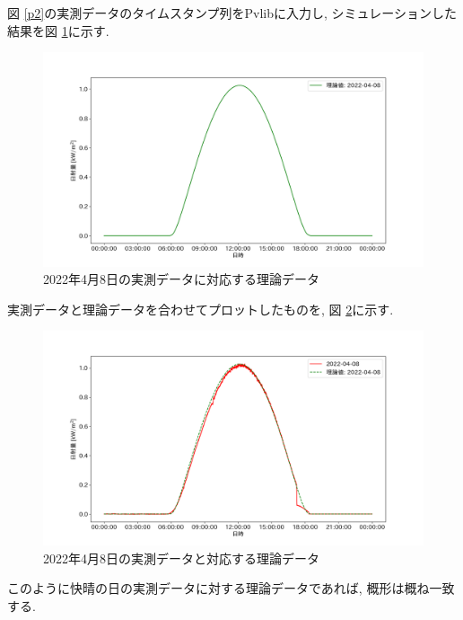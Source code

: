 \documentclass[a4j,12pt,]{jarticle}
\begin{document}
図 \ref{p2}の実測データのタイムスタンプ列をPvlibに入力し, シミュレーションした結果を図 \ref{p3}に示す. 

\begin{figure}[H]
  \begin{center}
    \includegraphics[width=160mm]{theoretical.png}
    \caption{2022年4月8日の実測データに対応する理論データ}
    \label{p3}
  \end{center}
\end{figure}

実測データと理論データを合わせてプロットしたものを, 図 \ref{p4}に示す. 

\begin{figure}[H]
  \begin{center}
    \includegraphics[width=160mm]{real_and_theoretical.png}
    \caption{2022年4月8日の実測データと対応する理論データ}
    \label{p4}
  \end{center}
\end{figure}

このように快晴の日の実測データに対する理論データであれば, 概形は概ね一致する. 
\end{document}
